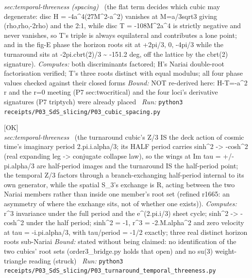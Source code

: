 \begin{description}
\textit{sec:temporal-threeness (spacing)} \ (the flat term decides which cubic may degenerate: disc H = -4a\textasciicircum{}4(27M\textasciicircum{}2-a\textasciicircum{}2) vanishes at M=a/3sqrt3 giving (rho,rho,-2rho) and the 2:1, while disc T = -108M\textasciicircum{}2a\textasciicircum{}4 is strictly negative and never vanishes, so T's triple is always equilateral and contributes a lone point; and in the fig-E phase the horizon roots sit at +2pi/3, 0, -4pi/3 while the turnaround sits at -2pi.cbrt(2)/3 \textasciitilde{} -151.2 deg, off the lattice by the cbrt(2) signature). 
\emph{Computes:} both discriminants factored; H's Nariai double-root factorisation verified; T's three roots distinct with equal modulus; all four phase values checked against their closed forms
 \emph{Bound:} NOT re-derived here: H-T=-a\textasciicircum{}2 r and the r=0 meeting (P7 sec:twocritical) and the four loci's derivative signatures (P7 triptych) were already placed
\ \emph{Run:} \texttt{python3 receipts/P03\_SdS\_slicing/P03\_cubic\_spacing.py}
\item[\rcptlabel{P03_turnaround_temporal_threeness}{P3R11}\textbf{P3R11}\quad\texttt{P03\_turnaround\_temporal\_threeness}]\hfill\textsf{[OK]}\\
\textit{sec:temporal-threeness} \ (the turnaround cubic's Z/3 IS the deck action of cosmic time's imaginary period 2.pi.i.alpha/3; its HALF period carries sinh\textasciicircum{}2 -> -cosh\textasciicircum{}2 (real expanding leg -> conjugate collapse law), so the wings at Im tau = +/- pi.alpha/3 are half-period images and the turnaround IS the half-period point; the temporal Z/3 factors through a branch-exchanging half-period internal to its own generator, while the spatial S\_3's exchange is R, acting between the two Nariai members rather than inside one member's root set (refined r1665: an asymmetry of where the exchange sits, not of whether one exists)). 
\emph{Computes:} r\textasciicircum{}3 invariance under the full period and the e\textasciicircum{}(2.pi.i/3) sheet cycle; sinh\textasciicircum{}2 -> -cosh\textasciicircum{}2 under the half period; sinh\textasciicircum{}2 = -1, r\textasciicircum{}3 = -2.M.alpha\textasciicircum{}2 and zero velocity at tau = -i.pi.alpha/3, with tau/period = -1/2 exactly; three real distinct horizon roots sub-Nariai
 \emph{Bound:} stated without being claimed: no identification of the two cubics' root sets (order3\_bridge.py holds that open) and no su(3) weight-triangle reading (struck)
\ \emph{Run:} \texttt{python3 receipts/P03\_SdS\_slicing/P03\_turnaround\_temporal\_threeness.py}

\end{description}
